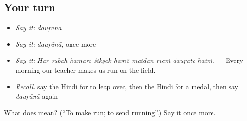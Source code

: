 \subsection*{Your turn}
\begin{itemize}
\raggedright
  \item \emph{Say it:} \emph{dauṛānā}
  \item \emph{Say it:} \emph{dauṛānā}, once more
  \item \emph{Say it:} \emph{Har subah hamāre śikṣak hamẽ maidān meṁ dauṛāte haiṁ.} — Every morning our teacher makes us run on the field.
  \item \emph{Recall:} say the Hindi for to leap over, then the Hindi for a medal, then say \emph{dauṛānā} again
\end{itemize}

\begin{tcolorbox}[breakable,colback=teal!4,colframe=teal!35!black,title={Before you move on}]
What does  mean? (\textquotedblleft{}To make run; to send running\textquotedblright{}.) Say it once more.
\end{tcolorbox}
